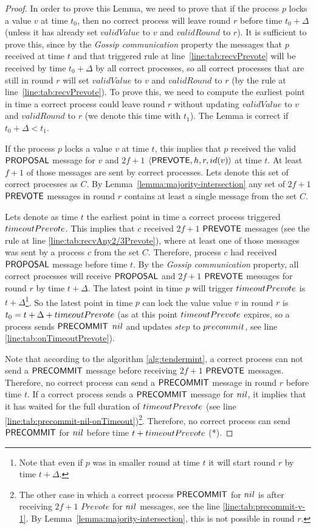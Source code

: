\begin{proof}
In order to prove this Lemma, we need to prove that if the process $p$ locks a value $v$ at time $t_0$, then no correct process will leave round $r$ before time $t_0 + \Delta$ (unless it has already set $validValue$ to $v$ and $validRound$ to $r$). It is sufficient to prove this, since by the \emph{Gossip communication} property the messages that $p$ received at time $t$ and that triggered rule at line~\ref{line:tab:recvPrevote} will be received by time $t_0 + \Delta$ by all correct processes, so all correct processes that are still in round $r$ will set $validValue$ to $v$ and $validRound$ to $r$ (by the rule at line~\ref{line:tab:recvPrevote}). To prove this, we need to compute the earliest point in time a correct process could leave round $r$ without updating $validValue$ to $v$ and $validRound$ to $r$ (we denote this time with $t_1$). The Lemma is correct if $t_0 + \Delta < t_1$. 

If the process $p$ locks a value $v$ at time $t$, this implies that $p$ received the valid $\mathsf{PROPOSAL}$ message for $v$ and $2f+1$ $\langle\mathsf{PREVOTE},h,r,id(v)\rangle$ at time $t$. At least $f+1$ of those messages are sent by correct processes. Lets denote this set of correct processes as $C$. By Lemma~\ref{lemma:majority-intersection} any set of $2f+1$ $\mathsf{PREVOTE}$ messages in round $r$ contains at least a single message from the set $C$. 

Lets denote as time $t$ the earliest point in time a correct process triggered $timeoutPrevote$. This implies that $c$ received $2f+1$ $\mathsf{PREVOTE}$ messages
(see the rule at line \ref{line:tab:recvAny2/3Prevote}), where at least one of those messages was sent by a process $c$ from the set $C$.  Therefore, process $c$ had received $\mathsf{PROPOSAL}$ message before time $t$. By the \emph{Gossip communication} property, all correct processes will receive $\mathsf{PROPOSAL}$ and $2f+1$ $\mathsf{PREVOTE}$ messages for round $r$ by time $t+\Delta$. The latest point in time $p$ will trigger $timeoutPrevote$ is $t+\Delta$\footnote{Note that even if $p$ was in smaller round at time $t$ it will start round $r$ by time $t+\Delta$.}.  So the latest point in time $p$ can lock the value value $v$ in round $r$ is $t_0 = t+\Delta+timeoutPrevote$ (as at this point $timeoutPrevote$ expires, so a process sends $\mathsf{PRECOMMIT}$ $nil$ and updates $step$ to $precommit$, see line \ref{line:tab:onTimeoutPrevote}).  

Note that according to the algorithm \ref{alg:tendermint}, a correct process can not send a $\mathsf{PRECOMMIT}$ message before receiving $2f+1$ $\mathsf{PREVOTE}$ messages.  Therefore, no correct process can send a $\mathsf{PRECOMMIT}$ message in round $r$ before time $t$. If a correct process sends a $\mathsf{PRECOMMIT}$ message for $nil$, it implies that it has waited for the full duration of $timeoutPrevote$ (see line \ref{line:tab:precommit-nil-onTimeout})\footnote{The other case in which a correct process $\mathsf{PRECOMMIT}$ for $nil$ is after receiving $2f+1$ $Prevote$ for $nil$ messages, see the line \ref{line:tab:precommit-v-1}. By Lemma~\ref{lemma:majority-intersection}, this is not possible in round $r$.}. Therefore, no correct process can send $\mathsf{PRECOMMIT}$ for $nil$ before time $t + timeoutPrevote$ (*).


\end{proof}

